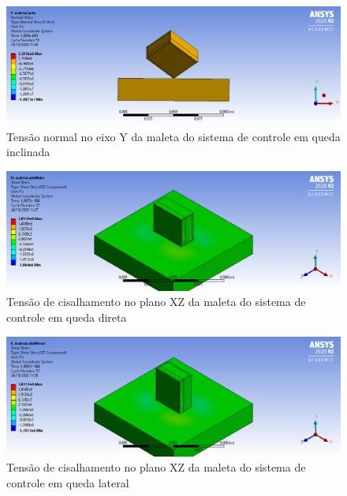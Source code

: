 \begin{apendicesenv}
\begin{figure}[htb]
    \centering
    \includegraphics[width=1.0\textwidth, angle=0]{figuras/estrutura_simulacaoImpacto/maletaNormalYCanto.png}
    \caption{Tensão normal no eixo Y da maleta do sistema de controle em queda inclinada}
    \label{fig:simulacaoImpacto_21}
\end{figure}

\begin{figure}[htb]
    \centering
    \includegraphics[width=1.0\textwidth, angle=0]{figuras/estrutura_simulacaoImpacto/maletaCisalhamentoXZMaior.png}
    \caption{Tensão de cisalhamento no plano XZ da maleta do sistema de controle em queda direta}
    \label{fig:simulacaoImpacto_22}
\end{figure}

\begin{figure}[htb]
    \centering
    \includegraphics[width=1.0\textwidth, angle=0]{figuras/estrutura_simulacaoImpacto/maletaCisalhamentoXZMenor.png}
    \caption{Tensão de cisalhamento no plano XZ da maleta do sistema de controle em queda lateral}
    \label{fig:simulacaoImpacto_23}
\end{figure}


\end{apendicesenv}

